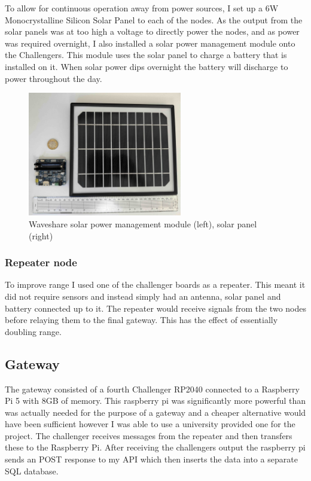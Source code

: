To allow for continuous operation away from power sources, I set up a 6W
Monocrystalline Silicon Solar Panel to each of the nodes. As the output from the
solar panels was at too high a voltage to directly power the nodes, and as power
was required overnight, I also installed a solar power management module onto
the Challengers. This module uses the solar panel to charge a battery that is
installed on it. When solar power dips overnight the battery will discharge to
power throughout the day.

\begin{figure}[H]
    \centering
    \includegraphics[width=0.6\textwidth]{contents/part-2/fig2/solar-panel-manager.jpg}
    \caption{Waveshare solar power management module (left), solar panel (right)}
    \label{fig:solar-module}
\end{figure}

\subsubsection{Repeater node}

To improve range I used one of the challenger boards as a repeater. This meant
it did not require sensors and instead simply had an antenna, solar panel and
battery connected up to it. The repeater would receive signals from the two
nodes before relaying them to the final gateway. This has the effect of
essentially doubling range.

\subsection{Gateway}

The gateway consisted of a fourth Challenger RP2040 connected to a Raspberry Pi
5 with 8GB of memory. This raspberry pi was significantly more powerful than was actually needed
for the purpose of a gateway and a cheaper alternative would have been
sufficient however I was able to use a university provided one for the project.
The challenger receives messages from the repeater and then transfers these to
the Raspberry Pi. After receiving the challengers output the raspberry pi sends
an POST response to my API which then inserts the data into a separate SQL
database.

